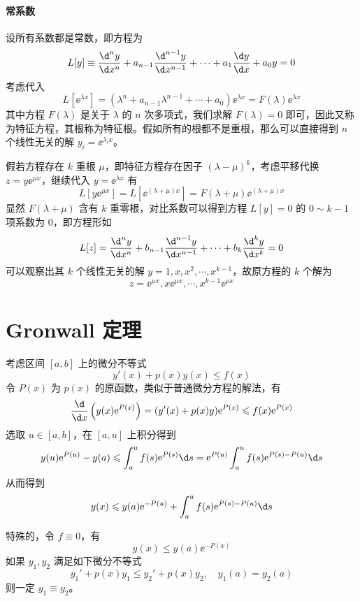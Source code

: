\paragraph{常系数}

设所有系数都是常数，即方程为
\[ L[y] \equiv \frac{\d^n y}{\d x^n} + a_{n-1} \frac{\d^{n-1} y}{\d x^{n-1}} + \cdots + a_1 \frac{\d y}{\d x} + a_0 y = 0 \]
考虑代入
\[ L[\ee^{\lambda x}] = (\lambda^n + a_{n-1} \lambda^{n-1} + \cdots + a_0) \ee^{\lambda x} = F(\lambda) \ee^{\lambda x} \]
其中方程 $F(\lambda)$ 是关于 $\lambda$ 的 $n$ 次多项式，我们求解 $F(\lambda) = 0$ 即可，因此又称为特征方程，其根称为特征根。假如所有的根都不是重根，那么可以直接得到 $n$ 个线性无关的解 $y_i = \ee^{\lambda_i x}$。

假若方程存在 $k$ 重根 $\mu$，即特征方程存在因子 $(\lambda - \mu)^k$，考虑平移代换 $z = y \ee^{\mu x}$，继续代入 $y = \ee^{\lambda x}$ 有
\[ L[y \ee^{\mu x}] = L[\ee^{(\lambda + \mu) x}] = F(\lambda + \mu) \ee^{(\lambda + \mu) x} \]
显然 $F(\lambda + \mu)$ 含有 $k$ 重零根，对比系数可以得到方程 $L[y] = 0$ 的 $0 \sim k-1$ 项系数为 $0$，即方程形如
\[ L[z] = \frac{\d^n y}{\d x^n} + b_{n-1} \frac{\d^{n-1} y}{\d x^{n-1}} + \cdots + b_{k} \frac{\d^k y}{\d x^k} = 0 \]
可以观察出其 $k$ 个线性无关的解 $y = 1, x, x^2, \cdots, x^{k-1}$，故原方程的 $k$ 个解为
\[ z = \ee^{\mu x}, x \ee^{\mu x}, \cdots, x^{k-1} \ee^{\mu x} \]

\section{Gronwall 定理}

考虑区间 $[a, b]$ 上的微分不等式
\[ y'(x) + p(x) y(x) \leqslant f(x) \]
令 $P(x)$ 为 $p(x)$ 的原函数，类似于普通微分方程的解法，有
\[ \frac{\d }{\d x} \left(y(x) \ee^{P(x)}\right) = (y'(x) + p(x) y) \ee^{P(x)} \leqslant f(x) \ee^{P(x)} \]
选取 $u \in [a, b]$，在 $[a, u]$ 上积分得到
\[ y(u) \ee^{P(u)} - y(a) \leqslant \int_{a}^{u} f(s) \ee^{P(s)} \d s = \ee^{P(u)} \int_{a}^{u} f(s) \ee^{P(s) - P(u)} \d s  \]
从而得到
\[ y(x) \leqslant y(a) \ee^{-P(u)} + \int_{a}^{u} f(s) \ee^{P(s) - P(u)} \d s \]

特殊的，令 $f \equiv 0$，有
\[ y(x) \leqslant y(a) \ee^{-P(x)} \]
如果 $y_1, y_2$ 满足如下微分不等式
\[ y_1' + p(x) y_1 \leqslant y_2' + p(x) y_2, \quad y_1(a) = y_2(a) \]
则一定 $y_1 \equiv y_2$。
